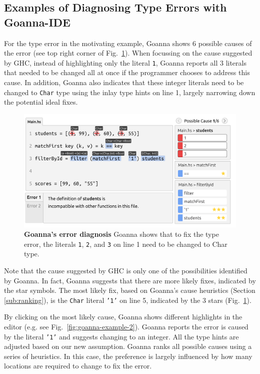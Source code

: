     \subsection{Examples of Diagnosing Type Errors with Goanna-IDE}

    For the type error in the motivating example, Goanna shows 6 possible causes of the error (see top right corner of Fig.~\ref{fig:goanna-example-1}). When focussing on the cause suggested by GHC, instead of highlighting only the literal \texttt{1}, Goanna reports all 3 literals that needed to be changed all at once if the programmer chooses to address this cause. In addition, Goanna also indicates that these integer literals need to be changed to \texttt{Char} type using the inlay type hints on line 1, largely narrowing down the potential ideal fixes. 
    

    \begin{figure}[ht!]
        \centering
        \includegraphics[width=\linewidth]{images/Goanna-Example-1}
        \caption[Goanna's showing possible causes of a type error (1)]{\textbf{Goanna's error diagnosis} Goanna shows that to fix the type error, the literals \texttt{1}, \texttt{2}, and \texttt{3} on line 1 need to be changed to Char type.}
        \label{fig:goanna-example-1}
    \end{figure}


    Note that the cause suggested by GHC is only one of the possibilities identified by Goanna. In fact, Goanna suggests that there are more likely fixes, indicated by the star symbols. The most likely fix, based on Goanna's cause heuristics (Section \ref{sub:ranking}), is the \texttt{Char} literal \texttt{'1'} on line 5, indicated by the 3 stars (Fig.~\ref{fig:goanna-example-1}).
    
    
    By clicking on the most likely cause, Goanna shows different highlights in the editor (e.g. see Fig.~\ref{fig:goanna-example-2}). Goanna reports the error is caused by the literal \texttt{'1'} and suggests changing to an integer. All the type hints are adjusted based on our new assumption. Goanna ranks all possible causes using a series of heuristics. In this case, the preference is largely influenced by how many locations are required to change to fix the error. 
    
